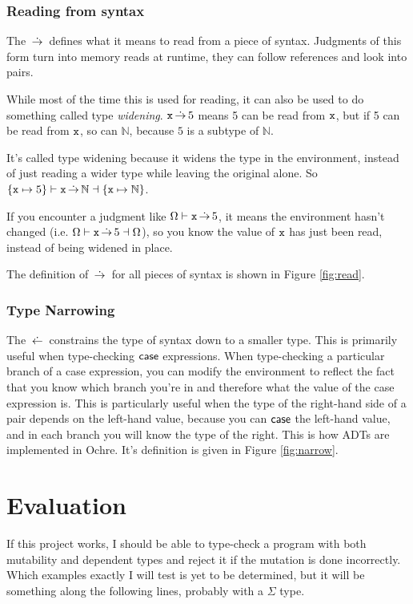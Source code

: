 \documentclass[12pt,twoside]{report}
\begin{document}
\subsection{Reading from syntax}
The $\,\dot{\rightarrow}\,$ defines what it means to read from a piece of syntax. Judgments of this form turn into memory reads at runtime, they can follow references and look into pairs.

While most of the time this is used for reading, it can also be used to do something called type \textit{widening}. $\text{\texttt{x}} \,\dot{\rightarrow}\, 5$ means 5 can be read from $\text{\texttt{x}}$, but if 5 can be read from $\text{\texttt{x}}$, so can $\mathbb{N}$, because $5$ is a subtype of $\mathbb{N}$.

It's called type widening because it widens the type in the environment, instead of just reading a wider type while leaving the original alone. So $\{\text{\texttt{x}} \mapsto 5\} \vdash \text{\texttt{x}} \,\dot{\rightarrow}\, \mathbb{N} \dashv \{\text{\texttt{x}} \mapsto \mathbb{N}\}$.

If you encounter a judgment like $\Omega \vdash \text{\texttt{x}} \,\dot{\rightarrow}\, 5$, it means the environment hasn't changed (i.e. $\Omega \vdash \text{\texttt{x}} \,\dot{\rightarrow}\, 5 \dashv \Omega$), so you know the value of $\text{\texttt{x}}$ has just been read, instead of being widened in place.

The definition of $\,\dot{\rightarrow}\,$ for all pieces of syntax is shown in Figure \ref{fig:read}.


\subsection{Type Narrowing}
The $\,\dot{\leftarrow}\,$ constrains the type of syntax down to a smaller type. This is primarily useful when type-checking $\mathsf{case}$ expressions. When type-checking a particular branch of a case expression, you can modify the environment to reflect the fact that you know which branch you're in and therefore what the value of the case expression is. This is particularly useful when the type of the right-hand side of a pair depends on the left-hand value, because you can $\mathsf{case}$ the left-hand value, and in each branch you will know the type of the right. This is how ADTs are implemented in Ochre. It's definition is given in Figure \ref{fig:narrow}.


\chapter{Evaluation}
If this project works, I should be able to type-check a program with both mutability and dependent types and reject it if the mutation is done incorrectly. Which examples exactly I will test is yet to be determined, but it will be something along the following lines, probably with a $\Sigma$ type.
\end{document}
